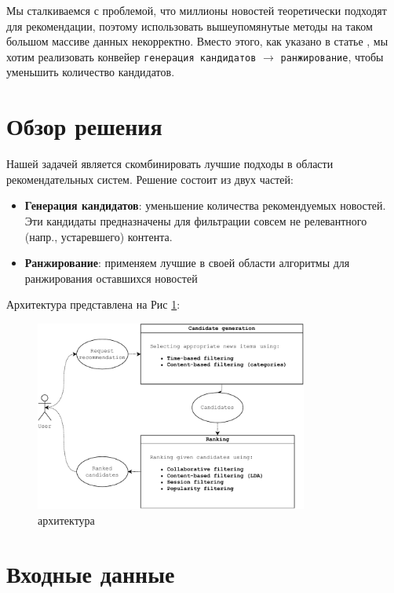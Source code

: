 \documentclass[14pt]{matmex-diploma-custom}
\begin{document}
Мы сталкиваемся с проблемой, что миллионы новостей теоретически подходят для рекомендации, поэтому использовать вышеупомянутые методы на таком большом массиве данных некорректно. Вместо этого, как указано в статье \citep {youtube}, мы хотим реализовать конвейер \texttt {генерация кандидатов} $ \to $ \texttt {ранжирование}, чтобы уменьшить количество кандидатов.



\section{Обзор решения}
\label{sec:overview}

Нашей задачей является скомбинировать лучшие подходы в области рекомендательных систем.
Решение состоит из двух частей:

\begin{itemize}
    \item \textbf{Генерация кандидатов}: уменьшение количества рекомендуемых новостей. Эти кандидаты предназначены для фильтрации совсем не релевантного (напр., устаревшего) контента.
    \item \textbf{Ранжирование}: применяем лучшие в своей области алгоритмы для ранжирования оставшихся новостей
\end{itemize}

Архитектура представлена на Рис \cref{fig:architecture}:

\begin{figure}[h]
    \centering
    \includegraphics[width=0.8\textwidth]{./images/architechture.pdf}
    \caption{архитектура}
    \label{fig:architecture}
\end{figure}

\section{Входные данные}
\label{sec:input}
\end{document}
